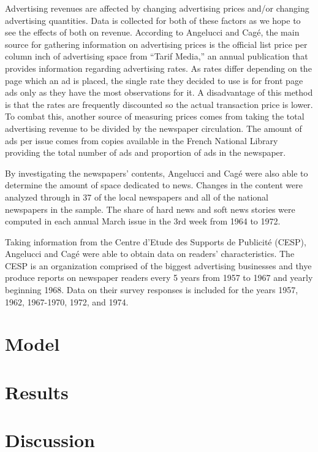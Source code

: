 \documentclass[
]{article}
\begin{document}
Advertising revenues are affected by changing advertising prices and/or changing advertising quantities. Data is collected for both of these factors as we hope to see the effects of both on revenue. According to Angelucci and Cagé, the main source for gathering information on advertising prices is the official list price per column inch of advertising space from ``Tarif Media,'' an annual publication that provides information regarding advertising rates. As rates differ depending on the page which an ad is placed, the single rate they decided to use is for front page ads only as they have the most observations for it. A disadvantage of this method is that the rates are frequently discounted so the actual transaction price is lower. To combat this, another source of measuring prices comes from taking the total advertising revenue to be divided by the newspaper circulation. The amount of ads per issue comes from copies available in the French National Library providing the total number of ads and proportion of ads in the newspaper.

By investigating the newspapers' contents, Angelucci and Cagé were also able to determine the amount of space dedicated to news. Changes in the content were analyzed through in 37 of the local newspapers and all of the national newspapers in the sample. The share of hard news and soft news stories were computed in each annual March issue in the 3rd week from 1964 to 1972.

Taking information from the Centre d'Etude des Supports de Publicité (CESP), Angelucci and Cagé were able to obtain data on readers' characteristics. The CESP is an organization comprised of the biggest advertising businesses and thye produce reports on newspaper readers every 5 years from 1957 to 1967 and yearly beginning 1968. Data on their survey responses is included for the years 1957, 1962, 1967-1970, 1972, and 1974.

\hypertarget{model}{%
\section{Model}\label{model}}

\hypertarget{results}{%
\section{Results}\label{results}}

\hypertarget{discussion}{%
\section{Discussion}\label{discussion}}
\end{document}
